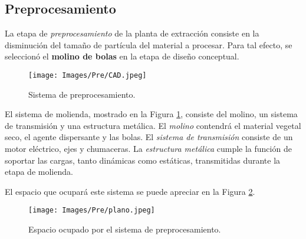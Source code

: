 \begin{center}
	\section{Preprocesamiento}
\end{center}

\noindent
\justify

La etapa de \textit{preprocesamiento} de la planta de extracci\'on consiste en la disminuci\'on del tama\~no de part\'icula del material a procesar. Para tal efecto, se seleccion\'o el \textbf{molino de bolas} en la etapa de dise\~no conceptual. 

\begin{figure}[h!]
	\centering
	\texttt{[image: Images/Pre/CAD.jpeg]}
	\caption{Sistema de preprocesamiento.}
	\label{prepro}
\end{figure}

\noindent
\justify

El sistema de molienda, mostrado en la Figura \ref{prepro}, consiste del molino, un sistema de transmisi\'on y una estructura met\'alica. El \textit{molino} contendr\'a el material vegetal seco, el agente dispersante y las bolas. El \textit{sistema de transmisi\'on} consiste de un motor el\'ectrico, ejes y chumaceras. La \textit{estructura met\'alica} cumple la funci\'on de soportar las cargas, tanto din\'amicas como est\'aticas, transmitidas durante la etapa de molienda. 

\newpage

\noindent
\justify

El espacio que ocupar\'a este sistema se puede apreciar en la Figura \ref{molino}.

\begin{figure}[h!]
	\centering
	\texttt{[image: Images/Pre/plano.jpeg]}
	\caption{Espacio ocupado por el sistema de preprocesamiento.}
	\label{molino}
\end{figure} 